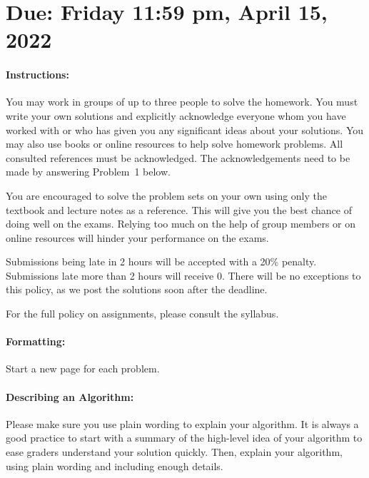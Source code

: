 \documentclass[11pt]{article}
\begin{document}
\maketitle

\section*{Due: Friday 11:59 pm, April 15, 2022}

\paragraph*{Instructions:}

You may work in groups of up to three people to solve the homework.
You must write your own solutions and explicitly acknowledge everyone whom 
you have worked with or who has given you any significant ideas about your solutions. 
You may also use books or online resources to help solve homework problems.  
All consulted references must be acknowledged. The acknowledgements need to be made by answering Problem~1 below.

You are encouraged to solve the problem sets on your own using only the textbook and lecture notes as a reference. This will give you the best chance of doing well on the exams. Relying too much on the help of group members or on online resources will hinder your performance on the exams.

Submissions being late in 2 hours will be accepted with a 20\% penalty. Submissions late more than 2 hours will receive 0. There will be no exceptions to this policy, as we post the solutions soon after the deadline. 

For the full policy on assignments, please consult the syllabus.

\paragraph*{Formatting:} Start a new page for each problem.

\paragraph*{Describing an Algorithm:} Please make sure you use plain wording to explain your algorithm. It is always a good practice to start with a summary of the high-level idea of your algorithm to ease graders understand your solution quickly. Then, explain your algorithm, using plain wording and including enough details.
\end{document}
